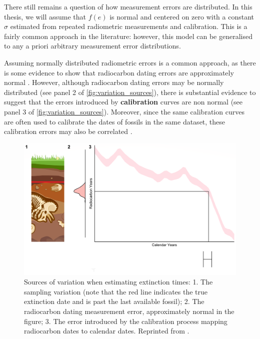 There still remains a question of how measurement errors are distributed. In this thesis, we will assume that $f(e)$ is normal and centered on zero with a constant $\sigma$ estimated from repeated radiometric  measurements and calibration. This is a fairly common approach in the literature: however, this model can be generalised to any a priori arbitrary measurement error distributions.

Assuming normally distributed radiometric errors is a common approach, as there is some evidence to show that radiocarbon dating errors are approximately normal \cite{Walker2005Quaternary}. However, although radiocarbon dating errors may be normally distributed (see panel 2 of \autoref{fig:variation_sources}), there is substantial evidence to suggest that the errors introduced by \textbf{calibration} curves are non normal (see panel 3 of \autoref{fig:variation_sources}). Moreover, since the same calibration curves are often used to calibrate the dates of fossils in the same dataset, these calibration errors may also be correlated \cite{Ramsey2009, Ramsey2010, Ramsey2013}.

\begin{figure}[ht]
    \centering
    \includegraphics[width=\linewidth]{figures/variation-sources-king.png}
    \caption{Sources of variation when estimating extinction times: 1. The sampling variation (note that the red line indicates the true extinction date and is past the last available fossil); 2. The radiocarbon dating measurement error, approximately normal in the figure; 3. The error introduced by the calibration process mapping radiocarbon dates to calendar dates. Reprinted from \citet{King2020}.}
    \label{fig:variation_sources}
\end{figure}
